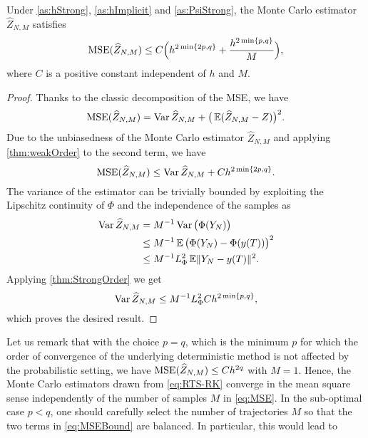 \documentclass[10pt]{article}
\begin{document}
\begin{theorem}\label{thm:MSEMonteCarlo} Under \cref{as:hStrong}, \cref{as:hImplicit} and \cref{as:PsiStrong}, the Monte Carlo estimator $\hat Z_{N,M}$ satisfies
	\begin{equation}\label{eq:MSEBound}
		\operatorname{MSE}(\widehat Z_{N,M}) \leq C\Big(h^{2\min\{2p, q\}} + \frac{h^{2\min\{p, q\}}}{M}\Big),
	\end{equation}
	where $C$ is a positive constant independent of $h$ and $M$.
\end{theorem}
\begin{proof} Thanks to the classic decomposition of the MSE, we have
	\begin{equation}\label{eq:MSEDecomposition}
		\operatorname{MSE}(\widehat Z_{N,M}) = \operatorname{Var} \widehat Z_{N,M}  + \big(\operatorname{\mathbb{E}}(\widehat Z_{N,M} - Z)\big)^2.
	\end{equation}
	Due to the unbiasedness of the Monte Carlo estimator $\hat Z_{N, M}$ and applying \cref{thm:weakOrder} to the second term, we have
	\begin{equation}\label{eq:MSEWeakOrder}
		\operatorname{MSE}(\widehat Z_{N,M}) \leq \operatorname{Var} \widehat Z_{N,M}  + Ch^{2\min\{2p, q\}}.
	\end{equation}
	The variance of the estimator can be trivially bounded by exploiting the Lipschitz continuity of $\Phi$ and the independence of the samples {as}
	\begin{equation}\label{eq:MSELipschitz}
	\begin{aligned}
		\operatorname{Var}\widehat Z_{N, M} &= M^{-1} \operatorname{Var}\big(\Phi(Y_N)\big)\\
		&\leq M^{-1} \operatorname{\mathbb{E}}\big(\Phi(Y_N) - \Phi(y(T))\big)^2 \\
		&\leq M^{-1} L_\Phi^2 \operatorname{\mathbb{E}} \lVert Y_N - y(T)\rVert^2.
	\end{aligned}
	\end{equation}
	Applying \cref{thm:StrongOrder} we get
	\begin{equation}
		\operatorname{Var}\widehat Z_{N,M} \leq M^{-1} L_\Phi^2 Ch^{2\min\{p, q\}},
	\end{equation}
	which proves the desired result.
\end{proof}
Let us remark that with the choice $p = q$, which is the minimum $p$ for which the order of convergence of the underlying deterministic method is not affected by the probabilistic setting, we have $\operatorname{MSE}(\widehat Z_{N,M}) \leq Ch^{2q}$ with $M = 1$. Hence, the Monte Carlo estimators drawn from \eqref{eq:RTS-RK} converge in the mean square sense independently of the number of samples $M$ in \eqref{eq:MSE}. In the sub-optimal case $p < q$, one should carefully select the number of trajectories $M$ so that the two terms in \eqref{eq:MSEBound} are balanced. In particular, this would lead to
\end{document}
